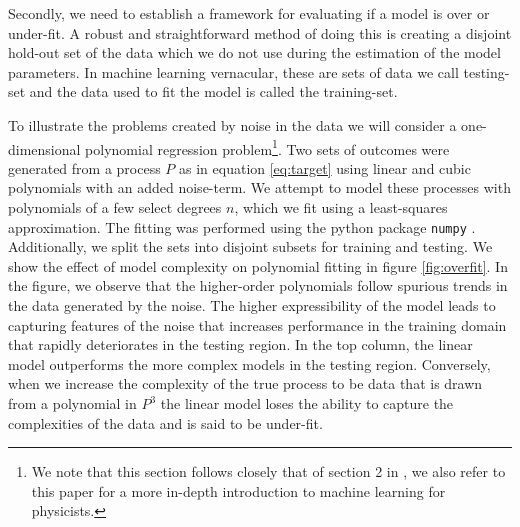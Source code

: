 Secondly, we need to establish a framework for evaluating if a model is over or under-fit. A robust and straightforward method of doing this is creating a disjoint hold-out set of the data which we do not use during the estimation of the model parameters. In machine learning vernacular, these are sets of data we call testing-set and the data used to fit the model is called the training-set. 

To illustrate the problems created by noise in the data we will consider a one-dimensional polynomial regression problem\footnote{We note that this section follows closely that of section 2 in \citet{Mehta2019}, we also refer to this paper for a more in-depth introduction to machine learning for physicists.}. Two sets of outcomes were generated from a process $P$ as in equation \ref{eq:target} using linear and cubic polynomials with an added noise-term. We attempt to model these processes with polynomials of a few select degrees $n$, which we fit using a least-squares approximation. The fitting was performed using the python package \lstinline{numpy} \cite{numpy}. Additionally, we split the sets into disjoint subsets for training and testing. We show the effect of model complexity on polynomial fitting in figure \ref{fig:overfit}. In the figure, we observe that the higher-order polynomials follow spurious trends in the data generated by the noise. The higher expressibility of the model leads to capturing features of the noise that increases performance in the training domain that rapidly deteriorates in the testing region. In the top column, the linear model outperforms the more complex models in the testing region. Conversely, when we increase the complexity of the true process to be data that is drawn from a polynomial in $P^3$ the linear model loses the ability to capture the complexities of the data and is said to be under-fit.  

